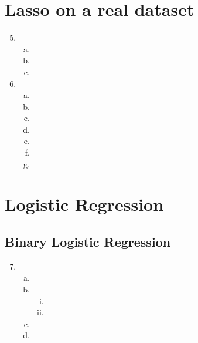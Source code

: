 \documentclass{article}
\newcommand{\1}[1]{\mathbf{1}\left\{#1\right\}}
\begin{document}
\section*{Lasso on a real dataset}
\begin{enumerate}[1.]
\setcounter{enumi}{4}
\item \begin{enumerate}[a.]
      \item
      \item
      \item
      \end{enumerate}
\item \begin{enumerate}[a.]
      \item
      \item
      \setcounter{enumii}{0}
      \item
      \item
      \item
      \item
      \item
      \end{enumerate}
\end{enumerate}

\section*{Logistic Regression}
\subsection*{Binary Logistic Regression}
\begin{enumerate}[1.]
\setcounter{enumi}{6}
\item \begin{enumerate}[a.]
      \item
      \item \begin{enumerate}[i.]
            \item
            \item
            \end{enumerate}
      \item
      \item
      \end{enumerate}
\end{enumerate}
\end{document}

